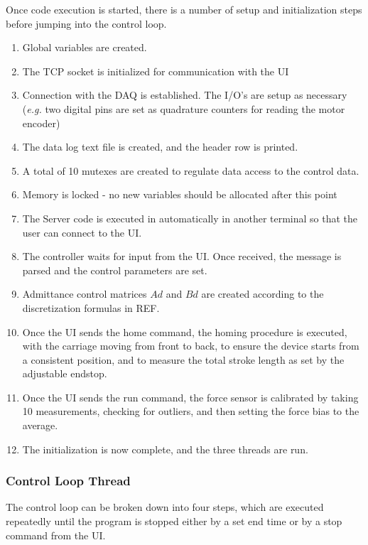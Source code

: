 \documentclass[12pt]{report}
\begin{document}
	Once code execution is started, there is a number of setup and initialization steps before jumping into the control loop. 
	
	\begin{enumerate}
		\item Global variables are created. 		
		\item The TCP socket is initialized for communication with the UI
		\item Connection with the DAQ is established. The I/O's are setup as necessary (\textit{e.g.} two digital pins are set as quadrature counters for reading the motor encoder)
		\item The data log text file is created, and the header row is printed. 
		\item A total of 10 mutexes are created to regulate data access to the control data.
		\item Memory is locked - no new variables should be allocated after this point
		\item The Server code is executed in automatically in another terminal so that the user can connect to the UI.
		\item The controller waits for input from the UI. Once received, the message is parsed and the control parameters are set. 
		\item Admittance control matrices $Ad$ and $Bd$ are created according to the discretization formulas in REF.
		\item Once the UI sends the home command, the homing procedure is executed, with the carriage moving from front to back, to ensure the device starts from a consistent position, and to measure the total stroke length as set by the adjustable endstop. 
		\item Once the UI sends the run command, the force sensor is calibrated by taking 10 measurements, checking for outliers, and then setting the force bias to the average. 
		\item The initialization is now complete, and the three threads are run.
	\end{enumerate}
	
	
	\subsubsection{Control Loop Thread}
	
	The control loop can be broken down into four steps, which are executed repeatedly until the program is stopped either by a set end time or by a stop command from the UI. 
	
\end{document}
